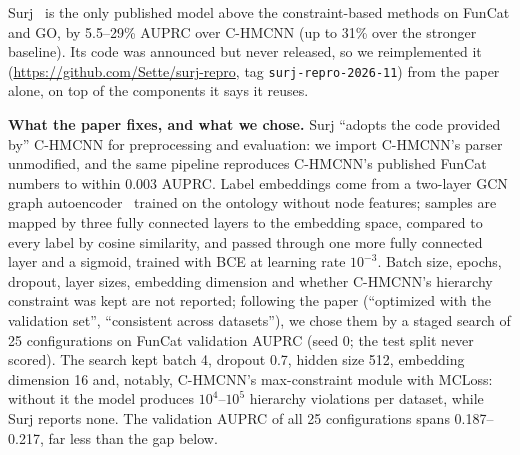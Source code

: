 \documentclass[preprint,12pt]{elsarticle}
\begin{document}
Surj~\cite{www2022ontology} is the only published model above the
constraint-based methods on FunCat and GO, by 5.5--29\% AUPRC over C-HMCNN (up
to 31\% over the stronger baseline).  Its code
was announced but never released, so we reimplemented it
(\url{https://github.com/Sette/surj-repro}, tag \texttt{surj-repro-2026-11}) from the paper alone, on top of
the components it says it reuses.

\textbf{What the paper fixes, and what we chose.}  Surj ``adopts the code
provided by'' C-HMCNN for preprocessing and evaluation: we import
C-HMCNN's parser unmodified, and the same pipeline reproduces C-HMCNN's
published FunCat numbers to within 0.003 AUPRC.  Label embeddings come
from a two-layer GCN graph autoencoder~\cite{kipf2016vgae} trained on
the ontology without node features; samples are mapped by three fully
connected layers to the embedding space, compared to every label by
cosine similarity, and passed through one more fully connected layer
and a sigmoid, trained with BCE at learning rate $10^{-3}$.  Batch size,
epochs, dropout, layer sizes, embedding dimension and whether
C-HMCNN's hierarchy constraint was kept are not reported; following the
paper (``optimized with the validation set'', ``consistent across
datasets''), we chose them by a staged search of 25 configurations on
FunCat validation AUPRC (seed 0; the test split never scored).  The
search kept batch 4, dropout 0.7, hidden size 512, embedding dimension
16 and, notably, C-HMCNN's max-constraint module with MCLoss: without
it the model produces $10^4$--$10^5$ hierarchy violations per dataset,
while Surj reports none.  The validation AUPRC of all 25 configurations
spans 0.187--0.217, far less than the gap below.
\end{document}
